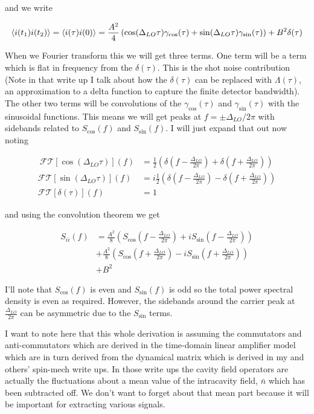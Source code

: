 \documentclass[12pt]{article}
\begin{document}
and we write

\begin{align}
\Braket{i(t_1)i(t_2)} = \Braket{i(\tau)i(0)} = \frac{A^2}{4}\left(\cos(\Delta_{LO}\tau)\gamma_{\cos}(\tau) + \sin(\Delta_{LO}\tau)\gamma_{\sin}(\tau)\right) + B^2 \delta(\tau)
\end{align}

When we Fourier transform this we will get three terms. One term will be a term which is flat in frequency from the $\delta(\tau)$. This is the shot noise contribution (Note in that write up I talk about how the $\delta(\tau)$ can be replaced with $\Lambda(\tau)$, an approximation to a delta function to capture the finite detector bandwidth). The other two terms will be convolutions of the $\gamma_{\cos}(\tau)$ and $\gamma_{\sin}(\tau)$ with the sinusoidal functions. This means we will get peaks at $f = \pm \Delta_{LO}/2\pi$ with sidebands related to $S_{\cos}(f)$ and $S_{\sin}(f)$. I will just expand that out now noting

\begin{align}
\
\mathcal{FT}[\cos(\Delta_{LO}\tau)](f) &= \frac{1}{2} \left(\delta\left(f - \frac{\Delta_{LO}}{2\pi}\right) + \delta\left(f + \frac{\Delta_{LO}}{2\pi}\right)\right)\\
\mathcal{FT}[\sin(\Delta_{LO}\tau)](f) &= i\frac{1}{2} \left(\delta\left(f - \frac{\Delta_{LO}}{2\pi}\right) - \delta\left(f + \frac{\Delta_{LO}}{2\pi}\right)\right)\\
\mathcal{FT}[\delta(\tau)](f) &= 1
\end{align}

and using the convolution theorem we get

\begin{align}
S_{ii}(f) &= \frac{A^2}{8} \left(S_{\cos}\left(f-\frac{\Delta_{LO}}{2\pi}\right) + iS_{\sin}\left(f-\frac{\Delta_{LO}}{2\pi}\right)\right)\\
&+ \frac{A^2}{8} \left(S_{\cos}\left(f+\frac{\Delta_{LO}}{2\pi}\right) - iS_{\sin}\left(f+\frac{\Delta_{LO}}{2\pi}\right)\right)\\
&+B^2
\end{align}

I'll note that $S_{\cos}(f)$ is even and $S_{\sin}(f)$ is odd so the total power spectral density is even as required. However, the sidebands around the carrier peak at $\frac{\Delta_{LO}}{2\pi}$ can be asymmetric due to the $S_{\sin}$ terms.

I want to note here that this whole derivation is assuming the commutators and anti-commutators which are derived in the time-domain linear amplifier model which are in turn derived from the dynamical matrix which is derived in my and others' spin-mech write ups. In those write ups the cavity field operators are actually the fluctuations about a mean value of the intracavity field, $\bar{n}$ which has been subtracted off. We don't want to forget about that mean part because it will be important for extracting various signals.
\end{document}
